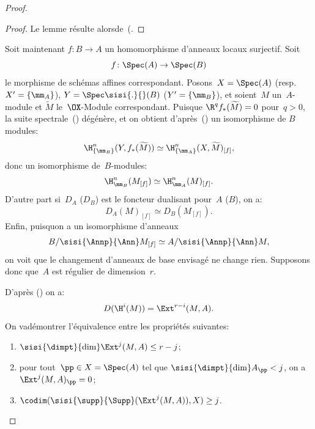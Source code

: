 \begin{proof}
\begin{proof}
Le lemme r\'esulte alors\pageoriginale de~(.
\end{proof}

Soit maintenant $f\colon B\to A$ un homomorphisme d'anneaux locaux surjectif. Soit
$$f\colon\Spec(A)\to\Spec(B)$$
le morphisme de sch\'emas affines correspondant. Posons~$X=\Spec(A)$ (resp.\ $X^{\prime}=\{\mm_{A}\}$), $Y=\Spec\sisi{.}{}(B)$ (\resp $Y^{\prime}=\{\mm_{B}\}$), et soient~$M$ un~$A$-module et $\widetilde{M}$ le~$\OX$-Module correspondant. Puisque $\R^{q}f_{\ast}(\widetilde{M})=0$ pour~$q>0$, la suite spectrale~() d\'eg\'en\`ere, et on obtient d'apr\`es~() un isomorphisme de $B$\sisi{~}{-}modules:
\begin{equation} \label{eq:V.18} \H_{\{\mm_{B}\} }^{n}(Y, f_{\ast}(\widetilde{M}))\simeq\H_{\{\mm_{A}\} }^{n}(X, \widetilde{M})_{[f]},
\end{equation}
donc un isomorphisme de~$B$-modules:
\begin{equation} \label{eq:V.19} \H_{\mm_{B}}^{n}(M_{[f]})\simeq\H_{\mm_{A}}^{n}(M)_{[f]}.
\end{equation}
D'autre part si~$D_{A}$ (\resp $D_{B}$) est le foncteur dualisant pour~$A$ (\resp $B$), on a:
\begin{equation} \label{eq:V.20} D_{A}(M)_{[f]}\simeq D_{B}(M_{[f]}).
\end{equation}
Enfin, puisquon a un isomorphisme d'anneaux
\begin{equation} \label{eq:V.21} B/\sisi{\Annp}{\Ann} M_{[f]}\simeq A/\sisi{\Annp}{\Ann} M,
\end{equation}
on voit que le changement d'anneaux de base envisag\'e ne change rien. Supposons donc que~$A$ est r\'egulier de dimension~$r$.

D'apr\`es () on a:
\begin{equation} \label{eq:V.22}
D(\H^{i}(M))=\Ext^{r-i}(M, A).
\end{equation}
On va\pageoriginale d\'emontrer l'\'equivalence entre les propri\'et\'es suivantes:
\begin{enumerate}
\item[(a)] $\sisi{\dimpt}{\dim} \Ext^{j}(M, A)\leq r-j$;
\item[(b)] pour tout~$\pp\in X=\Spec(A)$ tel que $\sisi{\dimpt}{\dim} A_{\pp}<j$, on a~$\Ext^{j}(M, A)_{\pp}=0$;
\item[(c)] $\codim(\sisi{\supp}{\Supp}(\Ext^{j}(M, A)), X)\geq j$.
\end{enumerate}


\end{proof}

